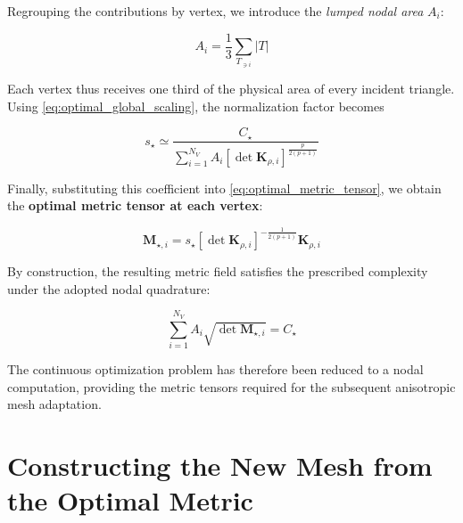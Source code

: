 \documentclass[11pt,a4paper]{article}
\begin{document}
\noindent Regrouping the contributions by vertex,
we introduce the \emph{lumped nodal area} $A_i$:

\begin{equation}
    \label{eq:lumped_nodal_area}
    \boxed{
    A_i=\frac{1}{3}
    \sum_{T_{\ni i}}|T|
    }
\end{equation}

\noindent Each vertex thus receives one third of
the physical area of every incident triangle.
Using \eqref{eq:optimal_global_scaling}, the
normalization factor becomes

\begin{equation}
    \label{eq:discrete_global_scaling}
    \boxed{
    s_\star\simeq
    \dfrac{
        C_\star
    }{
        \displaystyle\sum_{i=1}^{N_V}
        A_i
        \left[\det\mathbf K_{\rho,i}\right]^{
            \frac{p}{2(p+1)}
        }
    }
    }
\end{equation}

\noindent Finally, substituting this coefficient into
\eqref{eq:optimal_metric_tensor}, we obtain the
\textbf{optimal metric tensor at each vertex}:

\begin{equation}
    \label{eq:discrete_optimal_metric}
    \boxed{
    \mathbf M_{\star,i}
    =
    s_\star
    \left[\det\mathbf K_{\rho,i}\right]^{
        -\frac{1}{2(p+1)}
    }
    \mathbf K_{\rho,i}
    }
\end{equation}

\noindent By construction, the resulting metric field
satisfies the prescribed complexity under the
adopted nodal quadrature:

\begin{equation}
\label{eq:discrete_complexity}
    \boxed{
    \sum_{i=1}^{N_V}
    A_i\sqrt{\det\mathbf M_{\star,i}}
    =C_\star
    }
\end{equation}

\noindent The continuous optimization problem has
therefore been reduced to a nodal computation,
providing the metric tensors required for the
subsequent anisotropic mesh adaptation.




\section{Constructing the New Mesh from the Optimal Metric}
\label{sec:metric_remeshing}
\end{document}
